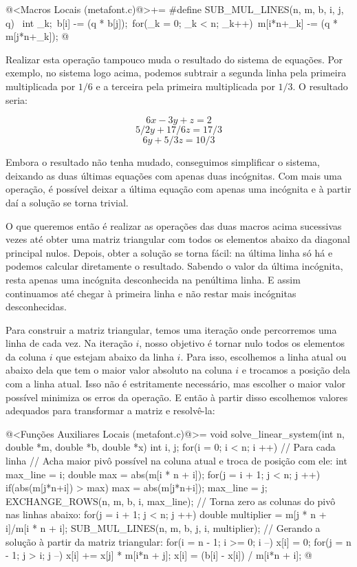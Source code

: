 \iniciocodigo
@<Macros Locais (metafont.c)@>+=
#define SUB_MUL_LINES(n, m, b, i, j, q) {\
  int _k;\
  b[i] -= (q * b[j]);\
  for(_k = 0; _k < n; _k++){\
      m[i*n+_k] -= (q * m[j*n+_k]);}}
@
\fimcodigo

Realizar esta operação tampouco muda o resultado do sistema de
equações. Por exemplo, no sistema logo acima, podemos subtrair a
segunda linha pela primeira multiplicada por $1/6$ e a terceira pela
primeira multiplicada por $1/3$. O resultado seria:

$$
6x-3y+z=2
$$
$$
5/2y+17/6z = 17/3
$$
$$
6y+5/3z=10/3
$$

Embora o resultado não tenha mudado, conseguimos simplificar o sistema,
deixando as duas últimas equações com apenas duas incógnitas. Com mais
uma operação, é possível deixar a última equação com apenas uma
incógnita e à partir daí a solução se torna trivial.

O que queremos então é realizar as operações das duas macros acima
sucessivas vezes até obter uma matriz triangular com todos os
elementos abaixo da diagonal principal nulos. Depois, obter a solução
se torna fácil: na última linha só há e podemos calcular diretamente o
resultado. Sabendo o valor da última incógnita, resta apenas uma
incógnita desconhecida na penúltima linha. E assim continuamos até
chegar à primeira linha e não restar mais incógnitas desconhecidas.

Para construir a matriz triangular, temos uma iteração onde
percorremos uma linha de cada vez. Na iteração $i$, nosso objetivo é
tornar nulo todos os elementos da coluna $i$ que estejam abaixo da
linha $i$. Para isso, escolhemos a linha atual ou abaixo dela que tem
o maior valor absoluto na coluna $i$ e trocamos a posição dela com a
linha atual. Isso não é estritamente necessário, mas escolher o maior
valor possível minimiza os erros da operação. E então à partir disso
escolhemos valores adequados para transformar a matriz e resolvê-la:

\iniciocodigo
@<Funções Auxiliares Locais (metafont.c)@>=
void solve_linear_system(int n, double *m, double *b, double *x){
  int i, j;
  for(i = 0; i < n; i ++){ // Para cada linha
    // Acha maior pivô possível na coluna atual e troca de posição com ele:
    int max_line = i;
    double max = abs(m[i * n + i]);
    for(j = i + 1; j < n; j ++){
      if(abs(m[j*n+i]) > max){
        max = abs(m[j*n+i]);
        max_line = j;
      }
    }
    EXCHANGE_ROWS(n, m, b, i, max_line);
    // Torna zero as colunas do pivô nas linhas abaixo:
    for(j = i + 1; j < n; j ++){
      double multiplier = m[j * n + i]/m[i * n + i];
      SUB_MUL_LINES(n, m, b, j, i, multiplier);
    }
  }
  // Gerando a solução à partir da matriz triangular:
  for(i = n - 1; i >= 0; i --){
    x[i] = 0;
    for(j = n - 1; j > i; j --)
      x[i] += x[j] * m[i*n + j];
    x[i] = (b[i] - x[i]) / m[i*n + i];
  }
}
@
\fimcodigo

